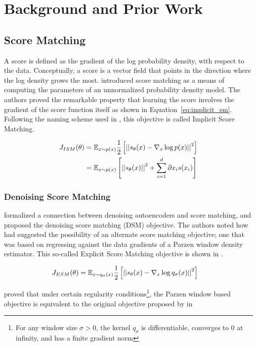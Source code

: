 \chapter{Background and Prior Work}
\label{ch:background}

\section{Score Matching}
A score is defined as the gradient of the log probability density, with respect to the data. Conceptually, a score is a vector field that points in the direction where the log density grows the most. 
\cite{hyvarinen2005} introduced score matching as a means of computing the parameters of an unnormalized probability density model. The authors proved the remarkable property that learning the score involves the gradient of the score function itself as shown in Equation~\ref{eq:implicit_sm}. Following the naming scheme used in \cite{vincent2011connection}, this objective is called Implicit Score Matching.

\begin{align}
\label{eq:implicit_sm}
    J_{ISM}(\theta) &= \mathbb{E}_{x \sim p(x)} \frac{1}{2} \left[ { \left|\left| {s_\theta(x) - \nabla_x \log p(x) } \right|\right|^2 } \right] \\
    &= \mathbb{E}_{x \sim p(x)} \left[ { \left|\left| {s_\theta(x)} \right|\right|^2 + \sum^{d}_{i=1}{\partial{x_{i}} s(x_{i}) } } \right]
\end{align}


\subsection*{Denoising Score Matching}

\cite{vincent2011connection} formalized a connection between denoising autoencoders and score matching, and proposed the denoising score matching (DSM) objective. The authors noted how \cite{hyvarinen2005} had suggested the possibility of an alternate score matching objective; one that was based on regressing against the data gradients of a Parzen window density estimator. This so-called Explicit Score Matching objective is shown in .

\begin{align}
\label{eq:explicit_sm}
    J_{ESM}(\theta) &= \mathbb{E}_{x \sim q_{\sigma}(x)} \frac{1}{2} \left[ { \left|\left| {s_\theta(x) - \nabla_x \log q_{\sigma}(x) } \right|\right|^2 } \right]
\end{align}

\cite{vincent2011connection} proved that under certain regularity conditions\footnote{For any window size $\sigma > 0$, the kernel $q_{\sigma}$ is differentiable, converges to 0 at infinity, and has a finite gradient norm},
the Parzen window based objective is equivalent to the original objective proposed by \cite{hyvarinen2005} in 

